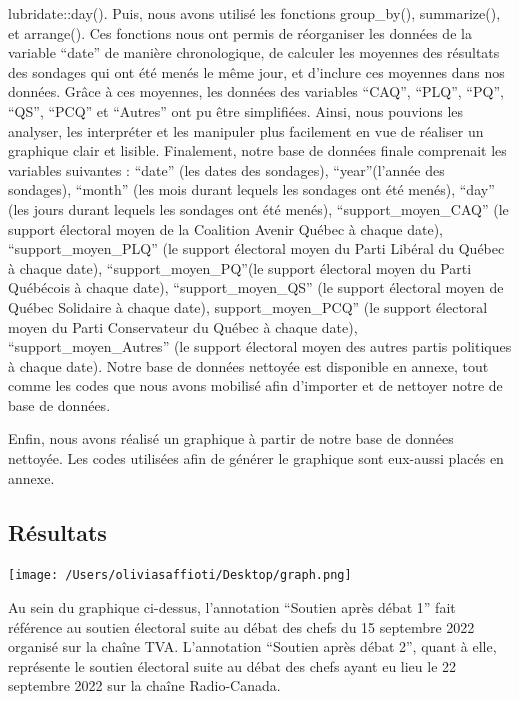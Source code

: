 \documentclass[
  letterpaper,
  DIV=11,
  numbers=noendperiod]{scrartcl}
\begin{document}
lubridate::day(). Puis, nous avons utilisé les fonctions group\_by(),
summarize(), et arrange(). Ces fonctions nous ont permis de réorganiser
les données de la variable ``date'' de manière chronologique, de
calculer les moyennes des résultats des sondages qui ont été menés le
même jour, et d'inclure ces moyennes dans nos données. Grâce à ces
moyennes, les données des variables ``CAQ'', ``PLQ'', ``PQ'', ``QS'',
``PCQ'' et ``Autres'' ont pu être simplifiées. Ainsi, nous pouvions les
analyser, les interpréter et les manipuler plus facilement en vue de
réaliser un graphique clair et lisible. Finalement, notre base de
données finale comprenait les variables suivantes : ``date'' (les dates
des sondages), ``year''(l'année des sondages), ``month'' (les mois
durant lequels les sondages ont été menés), ``day'' (les jours durant
lequels les sondages ont été menés), ``support\_moyen\_CAQ'' (le support
électoral moyen de la Coalition Avenir Québec à chaque date),
``support\_moyen\_PLQ'' (le support électoral moyen du Parti Libéral du
Québec à chaque date), ``support\_moyen\_PQ''(le support électoral moyen
du Parti Québécois à chaque date), ``support\_moyen\_QS'' (le support
électoral moyen de Québec Solidaire à chaque date),
support\_moyen\_PCQ'' (le support électoral moyen du Parti Conservateur
du Québec à chaque date), ``support\_moyen\_Autres'' (le support
électoral moyen des autres partis politiques à chaque date). Notre base
de données nettoyée est disponible en annexe, tout comme les codes que
nous avons mobilisé afin d'importer et de nettoyer notre de base de
données.

Enfin, nous avons réalisé un graphique à partir de notre base de données
nettoyée. Les codes utilisées afin de générer le graphique sont
eux-aussi placés en annexe.

\hypertarget{ruxe9sultats}{%
\subsection{Résultats}\label{ruxe9sultats}}

\texttt{[image: /Users/oliviasaffioti/Desktop/graph.png]}

Au sein du graphique ci-dessus, l'annotation ``Soutien après débat 1''
fait référence au soutien électoral suite au débat des chefs du 15
septembre 2022 organisé sur la chaîne TVA. L'annotation ``Soutien après
débat 2'', quant à elle, représente le soutien électoral suite au débat
des chefs ayant eu lieu le 22 septembre 2022 sur la chaîne Radio-Canada.
\end{document}
